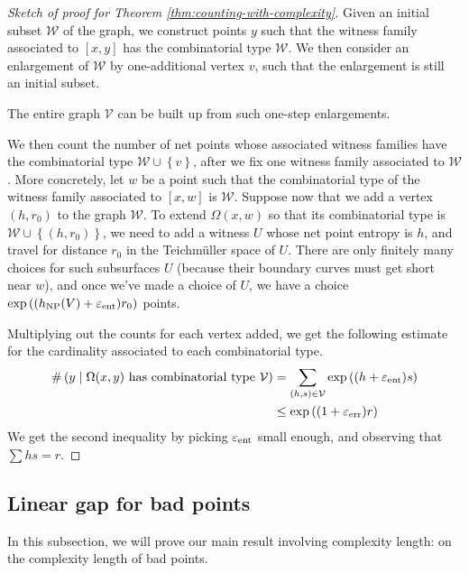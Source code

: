 \begin{proof}[Sketch of proof for Theorem \ref{thm:counting-with-complexity}]
  Given an initial subset $\mathcal{W}$ of the graph, we construct points $y$ such that the witness family associated to $[x,y]$ has the combinatorial type $\mathcal{W}$.
  We then consider an enlargement of $\mathcal{W}$ by one-additional vertex $v$, such that the enlargement is still an initial subset.
  \begin{claim*}
    The entire graph $\mathcal{V}$ can be built up from such one-step enlargements.
  \end{claim*}

  We then count the number of net points whose associated witness families have the combinatorial type $\mathcal{W} \cup \left\{ v \right\}$, after we fix one witness family associated to $\mathcal{W}$.
  More concretely, let $w$ be a point such that the combinatorial type of the witness family associated to $[x,w]$ is $\mathcal{W}$.
  Suppose now that we add a vertex $(h, r_0)$ to the graph $\mathcal{W}$.
  To extend $\Omega(x,w)$ so that its combinatorial type is $\mathcal{W} \cup \left\{ (h, r_0) \right\}$, we need to add a witness $U$ whose net point entropy is $h$, and travel for distance $r_0$ in the Teichmüller space of $U$.
  There are only finitely many choices for such subsurfaces $U$ (because their boundary curves must get short near $w$), and once we've made a choice of $U$, we have a choice $\exp\left( (h_{\mathrm{NP}}(V) + \varepsilon_{\mathrm{ent}}) r_0 \right)$ points.

  Multiplying out the counts for each vertex added, we get the following estimate for the cardinality associated to each combinatorial type.
  \begin{align*}
    \#\left( y \mid \text{$\Omega(x,y)$ has combinatorial type $\mathcal{V}$} \right) &= \sum_{(h, s) \in \mathcal{V}} \exp\left( (h + \varepsilon_{\mathrm{ent}})s \right) \\
    &\leq \exp\left( (1 + \varepsilon_{\mathrm{err}})r \right)
  \end{align*}
  We get the second inequality by picking $\varepsilon_{\mathrm{ent}}$ small enough, and observing that $\sum hs = r$.
\end{proof}

\subsection{Linear gap for bad points}
\label{sec:linear-gap-bad}

In this subsection, we will prove our main result involving complexity length: on the complexity length of bad points.

